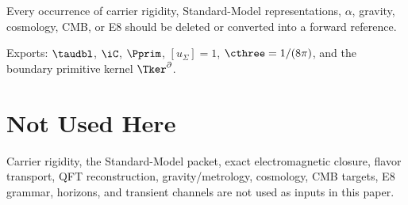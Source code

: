 \begin{tfptwarningbox}
Every occurrence of carrier rigidity, Standard-Model representations, $\alpha$, gravity,
cosmology, CMB, or E8 should be deleted or converted into a forward reference.
\end{tfptwarningbox}


\begin{tfptexports}
Exports: $\taudbl$, $\iC$, $\Pprim$, $[u_\Sigma]=1$, $\cthree=1/(8\pi)$, and the boundary primitive kernel $\Tker^\partial$.
\end{tfptexports}

\section{Not Used Here}

Carrier rigidity, the Standard-Model packet, exact electromagnetic closure, flavor transport,
QFT reconstruction, gravity/metrology, cosmology, CMB targets, E8 grammar, horizons, and transient
channels are not used as inputs in this paper.

\clearpage



